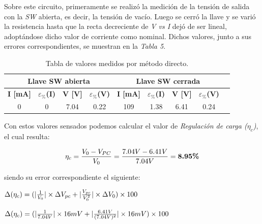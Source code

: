 \documentclass{article}
\begin{document}
\noindent Sobre este circuito, primeramente se realizó la medición de la tensión de salida con la \textit{SW} abierta, es decir, la tensión de vacío. Luego se cerró la llave y se varió la resistencia hasta que la recta decreciente de \textit{V vs I} dejó de ser lineal, adoptándose dicho valor de corriente como nominal. Dichos valores, junto a sus errores correspondientes, se muestran en la \textit{Tabla 5}.
\bigskip\bigskip


\begin{table}[!hbt]
	\begin{center}

		\begin{tabular}{|c|c|c|c|c|c|c|c|c|} \hline
			\multicolumn{4}{|c|}{\textbf{Llave SW abierta}} & \multicolumn{4}{c|}{\textbf{Llave SW cerrada}} \\ \hline
			\textbf{I [mA]} & \textbf{$\varepsilon_{\%}$(I)} & \textbf{V [V]} & \textbf{$\varepsilon_{\%}$(V)} & \textbf{I [mA]} & \textbf{$\varepsilon_{\%}$(I)} & \textbf{V [V]} & \textbf{$\varepsilon_{\%}$(V)} \\\cline{1-8}
			0 & 0 & 7.04 & 0.22 & 109 & 1.38 & 6.41 & 0.24 \\\cline{1-8}
		\end{tabular}

	\caption{Tabla de valores medidos por método directo.}
	\end{center}
\end{table}
\bigskip



Con estos valores sensados podemos calcular el valor de \textit{Regulación de carga ($\eta_c$)}, el cual resulta:
\bigskip

\begin{equation}
 	\eta_c = {V_0 - V_{PC} \over V_0} = {7.04V - 6.41V \over 7.04V} = \textbf{8.95\%}
\end{equation}
\bigskip


\newpage
\noindent siendo su error correspondiente el siguiente:
\bigskip

\begin{center}
	$\Delta(\eta_c) = (|{1 \over V_{0}}| \times \Delta V_{pc} + |{V_{pc} \over V_{0}^2}| \times \Delta V_{0})\times 100 $ \\
\end{center}

\begin{center}
	$\Delta(\eta_c) = (|{1 \over 7.04V}| \times 16mV + |{6.41V \over (7.04V)^2}| \times 16mV)\times 100$ \\
\end{center}
\end{document}
